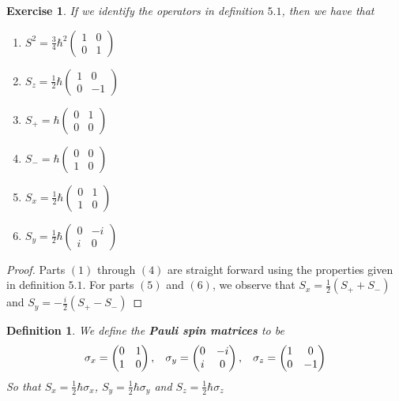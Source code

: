 \documentclass[12pt]{amsart}
\newtheorem{defn}[thm]{Definition}
\newtheorem{ex}[thm]{Exercise}
\newcommand{\sig}{\sigma}
\begin{document}
\begin{ex}
If we identify the operators in definition $5.1$, then we have that 
\begin{enumerate}
\item $S^2 = \frac{3}{4}\hbar^2 \begin{pmatrix}
1& 0 \\0& 1 
\end{pmatrix}$
\item $S_z = \frac{1}{2}\hbar \begin{pmatrix}
1& 0 \\
0& -1
\end{pmatrix}$
\item $S_{+} = \hbar \begin{pmatrix}
0 & 1\\
0 & 0
\end{pmatrix}$
\item $S_- = \hbar \begin{pmatrix}
0 & 0 \\
1 & 0
\end{pmatrix}$
\item $S_x = \frac{1}{2}\hbar \begin{pmatrix}
0 & 1 \\
1 & 0
\end{pmatrix}$ 
\item $S_y = \frac{1}{2}\hbar \begin{pmatrix}
0 & -i \\
i & 0
\end{pmatrix}$ 
\end{enumerate}
\end{ex}

\begin{proof}
Parts $(1)$ through $(4)$ are straight forward using the properties given in definition $5.1$. For parts $(5)$ and $(6)$, we observe that $S_x = \frac{1}{2}(S_+ +S_-)$ and $S_y = -\frac{i}{2}(S_+ - S_-)$
\end{proof}

\begin{defn}
We define the \textbf{Pauli spin matrices} to be $$\sig_x = \begin{pmatrix}
0 & 1 \\
1 & 0
\end{pmatrix}, \hspace{.3cm}
\sig_y = \begin{pmatrix}
0 & -i \\
i & 0
\end{pmatrix}, \hspace{.3cm}
\sig_z = \begin{pmatrix}
1 & 0 \\
0 & -1
\end{pmatrix}$$ So that $S_x = \frac{1}{2} \hbar\sig_x$, $S_y = \frac{1}{2} \hbar\sig_y$ and $S_z = \frac{1}{2} \hbar\sig_z$
\end{defn}
\end{document}
